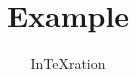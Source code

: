 \documentclass{article}
\title{Example}
\author{InTeXration}
\begin{document}
\maketitle
\lipsum
\end{document}
